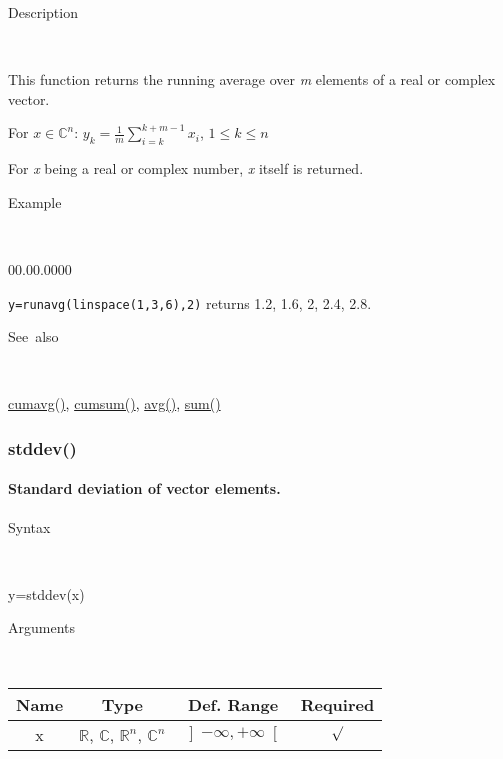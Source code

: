 \begin{description}
\item [Description]~
\end{description}
This function returns the running average over \textit{m} elements
of a real or complex vector.

\medskip{}
For $x\in$$\mathbb{C}^{n}$: $y_{k}=$${\displaystyle \frac{1}{m}}$$\sum\limits _{i=k}^{k+m-1}x_{i}$,
$1\leq k\leq n$
\medskip{}

\noindent For \textit{x} being a real or complex number, \textit{x}
itself is returned.

\begin{description}
\item [Example]~
\end{description}
\begin{lyxlist}{00.00.0000}
\item [\texttt{y=runavg(linspace(1,3,6),2)}]returns 1.2, 1.6, 2, 2.4, 2.8.
\end{lyxlist}
\begin{description}
\item [See~also]~
\end{description}
\textcolor{blue}{\hyperlink{cumavg}{cumavg()}}\textcolor{black}{,}
\textcolor{blue}{\hyperlink{cumsum}{cumsum()}}\textcolor{black}{,}
\textcolor{blue}{\hyperlink{avg}{avg()}}\textcolor{black}{,} \textcolor{blue}{\hyperlink{sum}{sum()}}


\newpage
\subsubsection*{\hypertarget{stddev}{}{\Large stddev()}}


\paragraph{\label{par:Standard-deviation}Standard deviation of vector elements.}

\begin{description}
\item [Syntax]~
\end{description}
y=stddev(x)

\begin{description}
\item [Arguments]~
\end{description}
\begin{tabular}{|c|c|c|c|}
\hline 
Name&
Type&
Def. Range&
Required\tabularnewline
\hline
\hline 
x&
$\mathbb{R}$, $\mathbb{C}$, $\mathbb{R}^{n}$, $\mathbb{C}^{n}$&
$\left]-\infty,+\infty\right[$&
$\surd$\tabularnewline
\hline
\end{tabular}

